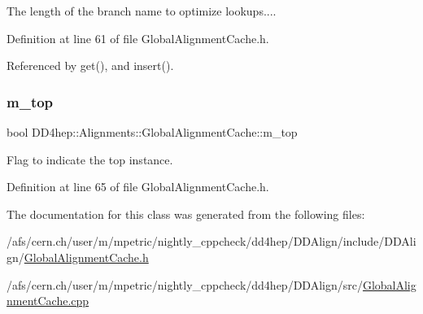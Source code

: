 The length of the branch name to optimize lookups.... 



Definition at line 61 of file Global\+Alignment\+Cache.\+h.



Referenced by get(), and insert().

\hypertarget{class_d_d4hep_1_1_alignments_1_1_global_alignment_cache_ad8ec69133c554aee9f43b7952d29c65e}{}\label{class_d_d4hep_1_1_alignments_1_1_global_alignment_cache_ad8ec69133c554aee9f43b7952d29c65e} 
\subsubsection{\texorpdfstring{m\+\_\+top}{m\_top}}
{\footnotesize\ttfamily bool D\+D4hep\+::\+Alignments\+::\+Global\+Alignment\+Cache\+::m\+\_\+top\hspace{0.3cm}{\ttfamily [protected]}}



Flag to indicate the top instance. 



Definition at line 65 of file Global\+Alignment\+Cache.\+h.



The documentation for this class was generated from the following files\+:\begin{DoxyCompactItemize}
\item 
/afs/cern.\+ch/user/m/mpetric/nightly\+\_\+cppcheck/dd4hep/\+D\+D\+Align/include/\+D\+D\+Align/\hyperlink{_global_alignment_cache_8h}{Global\+Alignment\+Cache.\+h}\item 
/afs/cern.\+ch/user/m/mpetric/nightly\+\_\+cppcheck/dd4hep/\+D\+D\+Align/src/\hyperlink{_global_alignment_cache_8cpp}{Global\+Alignment\+Cache.\+cpp}\end{DoxyCompactItemize}
